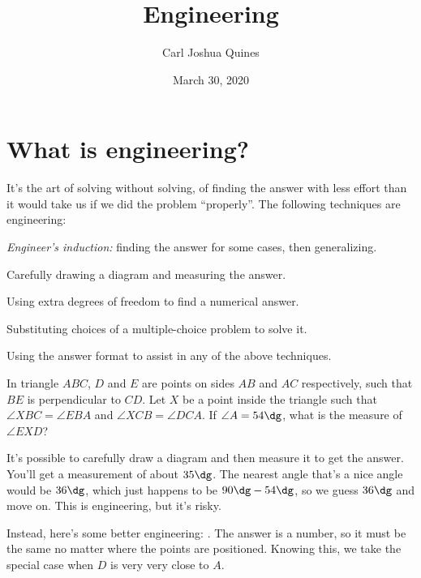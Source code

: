 \documentclass[11pt,paper=letter]{scrartcl}
\begin{document}
\title{Engineering}
\author{Carl Joshua Quines}
\date{March 30, 2020}

\maketitle

\section{What is engineering?}

 It's the art of solving without solving, of finding the answer with less effort than it would take us if we did the problem ``properly''. The following techniques are engineering:

\begin{itemthin}
  \item \emph{Engineer's induction:} finding the answer for some cases, then generalizing.
  \item Carefully drawing a diagram and measuring the answer.
  \item Using extra degrees of freedom to find a numerical answer.
  \item Substituting choices of a multiple-choice problem to solve it.
  \item Using the answer format to assist in any of the above techniques.
\end{itemthin}
\vspace{-12pt}

\begin{exboxed}
In triangle $ABC$, $D$ and $E$ are points on sides $AB$ and $AC$ respectively, such that $BE$ is perpendicular to $CD$. Let $X$ be a point inside the triangle such that $\angle XBC = \angle EBA$ and $\angle XCB = \angle DCA$. If $\angle A = 54\dg$, what is the measure of $\angle EXD$?
\end{exboxed}

It's possible to carefully draw a diagram and then measure it to get the answer. You'll get a measurement of about $35\dg$. The nearest angle that's a nice angle would be $36\dg$, which just happens to be $90\dg - 54\dg$, so we guess $36\dg$ and move on. This is engineering, but it's risky.

Instead, here's some better engineering: . The answer is a number, so it must be the same no matter where the points are positioned. Knowing this, we take the special case when $D$ is very very close to $A$.
\end{document}
